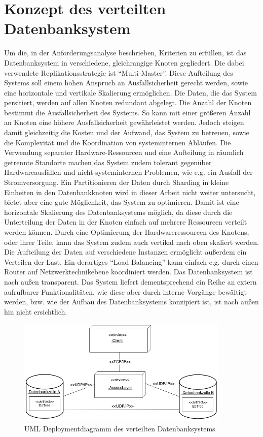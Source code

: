 \documentclass[a4paper,11pt,oneside,%
headsepline,												%
footsepline,												%
bibtotocnumbered									%
]{scrreprt}
\begin{document}
\section{Konzept des verteilten Datenbanksystem}
\label{sec:DBSystemConcept} 
Um die, in der Anforderungsanalyse beschrieben, Kriterien zu erfüllen, ist das Datenbanksystem  in verschiedene, gleichrangige Knoten gegliedert. Die dabei verwendete Replikationsstrategie ist \enquote{Multi-Master}. Diese Aufteilung des Systems  soll einem hohen Anspruch an Ausfallsicherheit gerecht werden, sowie eine horizontale und vertikale Skalierung ermöglichen. Die Daten, die das System persitiert, werden auf allen Knoten redundant abgelegt. Die Anzahl der Knoten bestimmt die Ausfallsicherheit des Systems. So kann mit einer größeren Anzahl an Knoten eine höhere Ausfallsicherheit gewährleistet werden. Jedoch steigen damit gleichzeitig die Kosten und der Aufwand, das System zu betreuen, sowie die Komplexität und die Koordination von systeminternen Abläufen. Die Verwendung separater Hardware-Ressourcen und eine Aufteilung in räumlich getrennte Standorte machen das System zudem tolerant gegenüber Hardwareausfällen und nicht-systeminternen Problemen, wie e.g. ein Ausfall der Stromversorgung. Ein Partitionieren der Daten durch Sharding in kleine Einheiten in den Datenbankknoten wird in dieser Arbeit nicht weiter untersucht, bietet aber eine gute Möglichkeit, das System zu optimieren. Damit ist eine horizontale Skalierung des Datenbanksystems möglich, da diese durch die Unterteilung der Daten in der Knoten einfach auf mehrere Ressourcen verteilt werden können. Durch eine Optimierung der Hardwareressourcen des Knotens, oder ihrer Teile, kann das System zudem auch vertikal nach oben skaliert werden. Die Aufteilung der Daten auf verschiedene Instanzen ermöglicht außerdem ein Verteilen der Last. Ein derartiges \enquote{Load Balancing} kann einfach e.g. durch einen Router auf Netzwerktechnikebene koordiniert werden. Das Datenbanksystem ist nach außen transparent. Das System liefert dementsprechend ein Reihe an extern aufrufbarer Funktionalitäten, wie diese aber durch interne Vorgänge bewältigt werden, bzw. wie der Aufbau des Datenbanksystems konzipiert ist, ist nach außen hin nicht ersichtlich.
\begin{figure}[h!]
        \centering
    \includegraphics[width=0.9\textwidth]{bilder/uml_deployment_dia.png}
    \caption{UML Deploymentdiagramm des verteilten Datenbanksystems}
\end{figure}
\end{document}
